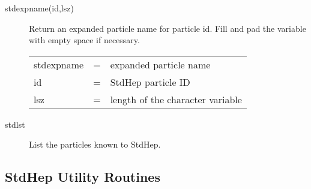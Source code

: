 \begin{description}
\item[stdexpname(id,lsz) ]
 Return an expanded particle name for particle id.
 Fill and pad the variable with empty space if necessary.

\begin{tabular}{lcl}
stdexpname & = & expanded particle name \\
id   & = & StdHep particle ID \\
lsz  & = & length of the character variable \\
\end{tabular}

\item[stdlst]
 List the particles known to StdHep.

\end{description}


\subsection{StdHep Utility Routines} 

